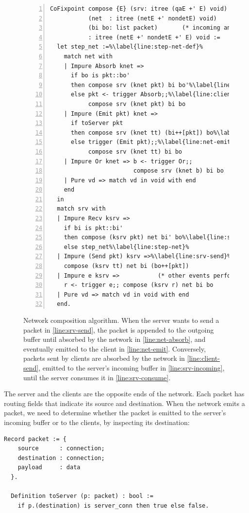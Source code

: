 \begin{figure}
\begin{lstlisting}[style=customcoq,numbers=left,escapechar=\%]
CoFixpoint compose {E} (srv: itree (qaE +' E) void)   (* server  model *)
           (net  : itree (netE +' nondetE) void)      (* network model *)
           (bi bo: list packet)       (* incoming and outgoing buffers *)
           : itree (netE +' nondetE +' E) void :=
  let step_net :=%\label{line:step-net-def}%
    match net with
    | Impure Absorb knet =>
      if bo is pkt::bo'
      then compose srv (knet pkt) bi bo'%\label{line:net-absorb}%
      else pkt <- trigger Absorb;;%\label{line:client-send}%
           compose srv (knet pkt) bi bo
    | Impure (Emit pkt) knet =>
      if toServer pkt
      then compose srv (knet tt) (bi++[pkt]) bo%\label{line:srv-incoming}%
      else trigger (Emit pkt);;%\label{line:net-emit}%
           compose srv (knet tt) bi bo
    | Impure Or knet => b <- trigger Or;;
                        compose srv (knet b) bi bo
    | Pure vd => match vd in void with end
    end
  in
  match srv with
  | Impure Recv ksrv =>
    if bi is pkt::bi'
    then compose (ksrv pkt) net bi' bo%\label{line:srv-consume}%
    else step_net%\label{line:step-net}%
  | Impure (Send pkt) ksrv =>%\label{line:srv-send}%
    compose (ksrv tt) net bi (bo++[pkt])
  | Impure e ksrv =>           (* other events performed by the server *)
    r <- trigger e;; compose (ksrv r) net bi bo
  | Pure vd => match vd in void with end
  end.
\end{lstlisting}
\caption[Network composition algorithm]{Network composition algorithm.  When the
  server wants to send a packet in \autoref{line:srv-send}, the packet is
  appended to the outgoing buffer until absorbed by the network in
  \autoref{line:net-absorb}, and eventually emitted to the client in
  \autoref{line:net-emit}.  Conversely, packets sent by clients are absorbed by
  the network in \autoref{line:client-send}, emitted to the server's incoming
  buffer in \autoref{line:srv-incoming}, until the server consumes it in
  \autoref{line:srv-consume}.}
\label{fig:net-compose-code}
\end{figure}

The server and the clients are the opposite ends of the network.  Each packet
has routing fields that indicate its source and destination.  When the network
emits a packet, we need to determine whether the packet is emitted to the
server's incoming buffer or to the clients, by inspecting its destination:
\begin{lstlisting}[style=customcoq]
  Record packet := {
    source      : connection;
    destination : connection;
    payload     : data
  }.

  Definition toServer (p: packet) : bool :=
    if p.(destination) is server_conn then true else false.
\end{lstlisting}


